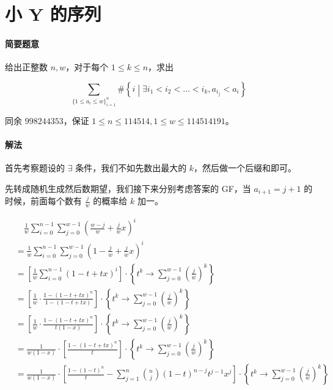 \documentclass[12pt]{ctexart}
\theoremstyle{theorem}
\theoremstyle{theorem}
\begin{document}
\section{小 Y 的序列}

\paragraph{简要题意}

给出正整数 $n, w$，对于每个 $1\le k\le n$，求出

$$
\sum_{\{1\le a_i\le w\}_{i=1}^n} \# \left\{
i \middle \vert \exists i_1<i_2<\dots <i_k, a_{i_j} < a_i
\right \}
$$

同余 $998244353$，保证 $1\le n\le 114514, 1\le w\le 114514191$。

\paragraph{解法}

首先考察题设的 $\exists$ 条件，我们不如先数出最大的 $k$，然后做一个后缀和即可。

先转成随机生成然后数期望，我们接下来分别考虑答案的 GF，当 $a_{i+1}=j+1$ 的时候，前面每个数有 $\frac jw$ 的概率给 $k$ 加一。

\begin{align*}
&\quad \frac 1w\sum_{i=0}^{n-1} \sum_{j=0}^{w-1} \left(\frac {w-j}w + \frac jw x\right)^i\\
&= \frac 1w\sum_{i=0}^{n-1} \sum_{j=0}^{w-1} \left(1 - \frac jw + \frac jw x\right)^i\\
&= \left[\frac 1w\sum_{i=0}^{n-1} \left(1 - t + t x\right)^i\right] \cdot \left\{ t^k \rightarrow \sum_{j=0}^{w-1} \left(\frac j w\right)^k \right\}\\
&= \left[\frac 1w \cdot \frac{1 - \left(1 - t + t x\right)^n}{1 -  \left(1 - t + t x\right)} \right] \cdot \left\{ t^k \rightarrow \sum_{j=0}^{w-1} \left(\frac j w\right)^k \right\}\\
&= \left[\frac 1w \cdot \frac{1 - \left(1 - t + t x\right)^n}{t(1-x)} \right] \cdot \left\{ t^k \rightarrow \sum_{j=0}^{w-1} \left(\frac j w\right)^k \right\}\\
&= \frac 1{w(1-x)} \cdot \left[\frac{1 - \left(1 - t + t x\right)^n}{t} \right] \cdot \left\{ t^k \rightarrow \sum_{j=0}^{w-1} \left(\frac j w\right)^k \right\}\\
&= \frac 1{w(1-x)} \cdot \left[\frac{1 - \left(1 - t\right)^n}{t} - \sum_{j=1}^n \binom n j (1-t)^{n-j}t^{j-1} x^j \right] \cdot \left\{ t^k \rightarrow \sum_{j=0}^{w-1} \left(\frac j w\right)^k \right\}
\end{align*}
\end{document}
